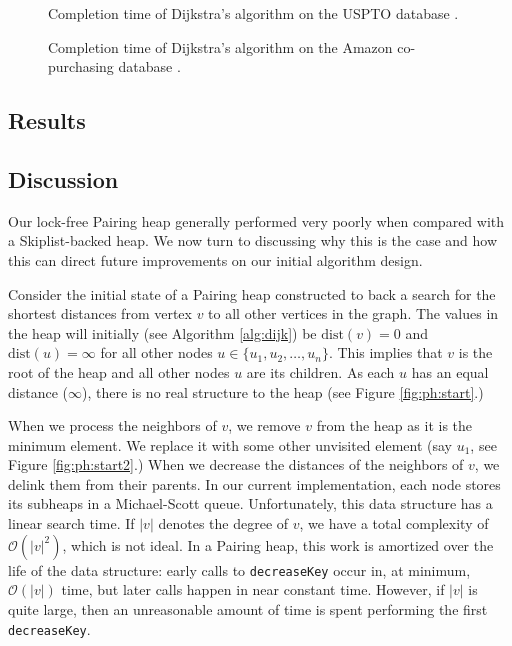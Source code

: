 \documentclass{acm_proc_article-sp}
\begin{document}
\begin{figure}[H]
  \caption{Completion time of Dijkstra's algorithm on the USPTO database \cite{leskovec05}.}
\end{figure}

\begin{figure}[H]
  \caption{Completion time of Dijkstra's algorithm on the Amazon co-purchasing database \cite{leskovec07}.}
\end{figure}

\subsection{Results}

\subsection{Discussion}
\label{sec:exp:disc}
Our lock-free Pairing heap generally performed very poorly
when compared with a Skiplist-backed heap. We now turn
to discussing why this is the case and how this
can direct future improvements on our initial
algorithm design.

Consider the initial state of a Pairing heap constructed
to back a search for the shortest distances from vertex $v$
to all other vertices in the graph. The values in the heap
will initially (see Algorithm \ref{alg:dijk}) be $\mathrm{dist}(v) = 0$
and $\mathrm{dist}(u) = \infty$ for all other nodes $u \in \{u_1, u_2, \dots, u_n\}$.
This implies that
$v$ is the root of the heap and all other nodes $u$ are its children.
As each $u$ has an equal distance ($\infty$), there
is no real structure to the heap (see Figure \ref{fig:ph:start}.)

When we process the neighbors of $v$, we remove $v$ from the heap
as it is the minimum element. We replace it with some other unvisited
element (say $u_1$, see Figure \ref{fig:ph:start2}.) When we decrease
the distances of the neighbors of $v$, we delink them from their parents.
In our current implementation, each node stores its subheaps
in a Michael-Scott \cite{michael96} queue. Unfortunately, 
this data structure has a linear search time. If $|v|$ denotes
the degree of $v$, we have a total complexity of $\mathcal{O}(|v|^2)$, which
is not ideal. In a Pairing heap, this work is amortized over the life
of the data structure: early calls to \texttt{decreaseKey} occur in, at minimum, $\mathcal{O}(|v|)$
time, but later calls happen in near constant time. However, if $|v|$ is quite large, then
an unreasonable amount of time is spent performing the first \texttt{decreaseKey}.
\end{document}
